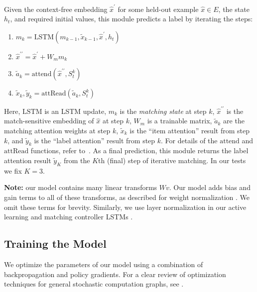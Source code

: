 Given the context-free embedding $\hat{x}^{\prime}$ for some held-out example $\hat{x} \in E$, the state $h_t$, and required initial values,
this module predicts a label by iterating the steps:
\begin{enumerate}
\setlength\itemsep{0.01em}
\item $m_k = \mbox{LSTM}(m_{k-1}, \tilde{x}_{k-1}, \hat{x}^{\prime}, h_t)$
\item $\hat{x}^{\prime\prime} = \hat{x}^{\prime} + W_m m_k$
\item $\tilde{a}_k = \mbox{attend}(\hat{x}^{\prime\prime}, S^k_t)$
\item $\tilde{x}_k, \tilde{y}_k = \mbox{attRead}(\tilde{a}_k, S^k_t)$
\end{enumerate}
Here, $\mbox{LSTM}$ is an LSTM update, $m_k$ is the \emph{matching state} at step $k$, $\hat{x}^{\prime\prime}$ is the match-sensitive embedding of $\hat{x}$ at step $k$, $W_m$ is a trainable matrix, $\tilde{a}_k$ are the matching attention weights at step $k$, $\tilde{x}_k$ is the ``item attention'' result from step $k$, and $\tilde{y}_k$ is the ``label attention'' result from step $k$.
For details of the $\mbox{attend}$ and $\mbox{attRead}$ functions, refer to~\citet{vinyals2016matching}.
As a final prediction, this module returns the label attention result $\tilde{y}_K$ from the $K$th (final) step of iterative matching. In our tests we fix $K = 3$.

\textbf{Note:} our model contains many linear transforms $W v$. Our model adds bias and gain terms to all of these transforms, as described for weight normalization \cite{Salimans2016}. We omit these terms for brevity. Similarly, we use layer normalization in our active learning and matching controller LSTMs \cite{Ba2016}.

\subsection{Training the Model}
\label{sec:model_training}

We optimize the parameters of our model using a combination of backpropagation and policy gradients. For a clear review of optimization techniques for general stochastic computation graphs, see \citet{schulman2015}.

